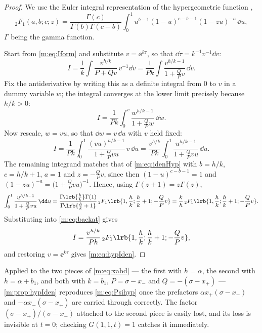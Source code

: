 \begin{proof}
We use the Euler integral representation of the hypergeometric function
\cite{Olver2010},
\begin{equation}
\label{m:eq:idenHyp}
{}_2F_1(a,b;c;z)
= \frac{\Gamma(c)}{\Gamma(b)\Gamma(c-b)}\int_0^1 u^{b-1}(1-u)^{c-b-1}(1-zu)^{-a}\,\dd u ,
\end{equation}
$\Gamma$ being the gamma function.

Start from \cref{m:eq:Iform} and substitute $v = \ee^{k\tau}$, so that
$\dd\tau = k^{-1}v^{-1}\dd v$:
\begin{equation*}
I = \frac1k\int\frac{v^{h/k}}{P+Qv}\,v^{-1}\dd v
= \frac{1}{Pk}\int\frac{v^{h/k-1}}{1+\frac{Q}{P}v}\,\dd v .
\end{equation*}
Fix the antiderivative by writing this as a definite integral from $0$ to $v$ in a
dummy variable $w$; the integral converges at the lower limit precisely because
$h/k>0$:
\begin{equation*}
I = \frac{1}{Pk}\int_0^v\frac{w^{h/k-1}}{1+\frac{Q}{P}w}\,\dd w .
\end{equation*}
Now rescale, $w = vu$, so that $\dd w = v\,\dd u$ with $v$ held fixed:
\begin{equation}
\label{m:eq:backat}
I = \frac{1}{Pk}\int_0^1\frac{(vu)^{h/k-1}}{1+\frac{Q}{P}vu}\,v\,\dd u
= \frac{v^{h/k}}{Pk}\int_0^1\frac{u^{h/k-1}}{1+\frac{Q}{P}vu}\,\dd u .
\end{equation}
The remaining integrand matches that of \cref{m:eq:idenHyp} with $b = h/k$,
$c = h/k+1$, $a=1$ and $z = -\tfrac{Q}{P}v$, since then $(1-u)^{c-b-1} = 1$ and
$(1-zu)^{-a} = \bigl(1+\tfrac{Q}{P}vu\bigr)^{-1}$. Hence, using
$\Gamma(z+1) = z\Gamma(z)$,
\begin{equation*}
\int_0^1\frac{u^{h/k-1}}{1+\frac{Q}{P}vu}\,\dd u
= \frac{\Gamma\!\lrb{\frac hk}\Gamma(1)}{\Gamma\!\lrb{\frac hk+1}}\,
{}_2F_1\lrb{1,\frac hk;\frac hk+1;-\frac QP v}
= \frac kh\,{}_2F_1\lrb{1,\frac hk;\frac hk+1;-\frac QP v}.
\end{equation*}
Substituting into \cref{m:eq:backat} gives
\begin{equation*}
I = \frac{v^{h/k}}{Ph}\,{}_2F_1\lrb{1,\frac hk;\frac hk+1;-\frac QP v},
\end{equation*}
and restoring $v = \ee^{k\tau}$ gives \cref{m:eq:hypIden}.
\end{proof}

\begin{remark}
Applied to the two pieces of \cref{m:eq:xabd} --- the first with $h=\alpha$, the
second with $h = \alpha+b_1$, and both with $k=b_1$, $P = \sigma-x_-$ and
$Q = -(\sigma-x_+)$ --- \cref{m:prop:hypIden} reproduces \cref{m:eq:Psihyp} once the
prefactors $\alpha x_+(\sigma-x_-)$ and $-\alpha x_-(\sigma-x_+)$ are carried
through correctly. The factor $(\sigma-x_+)/(\sigma-x_-)$ attached to the second
piece is easily lost, and its loss is invisible at $t=0$; checking $G(1,1,t)=1$
catches it immediately.
\end{remark}

